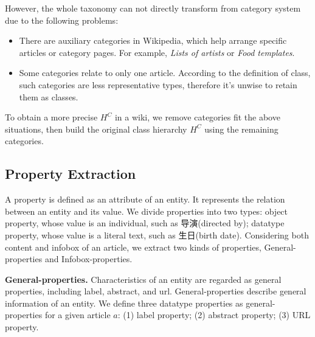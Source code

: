 \documentclass[runningheads,a4paper]{llncs}
\newcommand{\para}[1]{\vspace{0.1cm}\noindent\textbf{#1}}
\begin{document}
However, the whole taxonomy can not directly transform from category system due to the following problems:
\begin{itemize}
    \item There are auxiliary categories in Wikipedia, which help arrange specific articles or category pages. For example, \emph{Lists of artists} or \emph{Food templates}.
    \item Some categories relate to only one article. According to the definition of class, such categories are less representative types, therefore it's unwise to retain them as classes.
\end{itemize}

To obtain a more precise $H^C$ in a wiki, we remove categories fit the above situations, then build the original class hierarchy $H^C$ using the remaining categories.


\subsection{Property Extraction}
\label{sec:pe}
A property is defined as an attribute of an entity. It represents the relation between an entity and its value. We divide properties into two types: object property, whose value is an individual, such as 导演(directed by); datatype property, whose value is a literal text, such as 生日(birth date). Considering both content and infobox of an article, we extract two kinds of properties, General-properties and Infobox-properties.

\para{General-properties.} Characteristics of an entity are regarded as general properties, including label, abstract, and url. General-properties describe general information of an entity. We define three datatype properties as general-properties for a given article $a$: (1) label property; (2) abstract property; (3) URL property.
\end{document}
